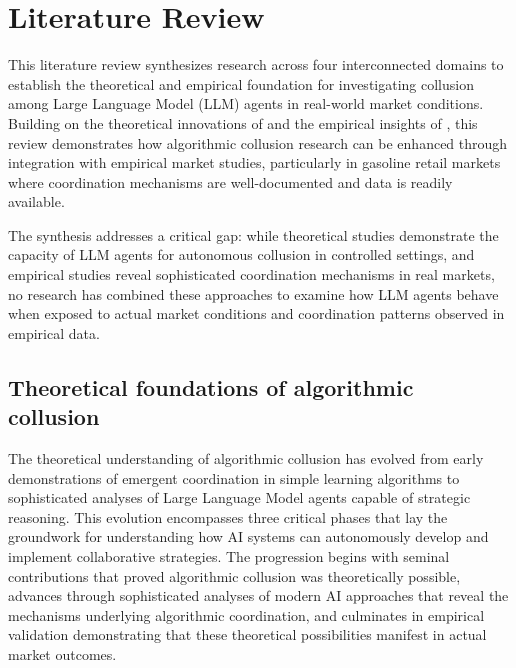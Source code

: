 \section{Literature Review}

% 
% 
% 
% 
% 

This literature review synthesizes research across four interconnected domains to establish the theoretical and empirical foundation for investigating collusion among Large Language Model (LLM) agents in real-world market conditions. Building on the theoretical innovations of \textcite{fish_algorithmic_2025} and the empirical insights of \textcite{byrne_learning_2019}, this review demonstrates how algorithmic collusion research can be enhanced through integration with empirical market studies, particularly in gasoline retail markets where coordination mechanisms are well-documented and data is readily available.

The synthesis addresses a critical gap: while theoretical studies demonstrate the capacity of LLM agents for autonomous collusion in controlled settings, and empirical studies reveal sophisticated coordination mechanisms in real markets, no research has combined these approaches to examine how LLM agents behave when exposed to actual market conditions and coordination patterns observed in empirical data.

\subsection{Theoretical foundations of algorithmic collusion}

The theoretical understanding of algorithmic collusion has evolved from early demonstrations of emergent coordination in simple learning algorithms to sophisticated analyses of Large Language Model agents capable of strategic reasoning. This evolution encompasses three critical phases that lay the groundwork for understanding how AI systems can autonomously develop and implement collaborative strategies. The progression begins with seminal contributions that proved algorithmic collusion was theoretically possible, advances through sophisticated analyses of modern AI approaches that reveal the mechanisms underlying algorithmic coordination, and culminates in empirical validation demonstrating that these theoretical possibilities manifest in actual market outcomes.


